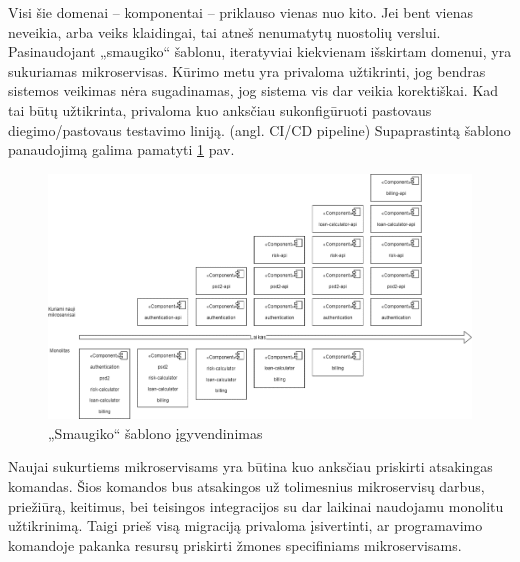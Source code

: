 \documentclass{VUMIFPSbakalaurinis}
\begin{document}
Visi šie domenai – komponentai – priklauso vienas nuo kito. Jei bent vienas neveikia, arba veiks klaidingai, tai atneš nenumatytų nuostolių verslui. Pasinaudojant „smaugiko“ šablonu, iteratyviai kiekvienam išskirtam domenui, yra sukuriamas mikroservisas. Kūrimo metu yra privaloma užtikrinti, jog bendras sistemos veikimas nėra sugadinamas, jog sistema vis dar veikia korektiškai. Kad tai būtų užtikrinta, privaloma kuo anksčiau sukonfigūruoti pastovaus diegimo/pastovaus testavimo liniją. (angl. CI/CD pipeline)  Supaprastintą šablono panaudojimą galima pamatyti \ref{img:smaugiko-sablonas} pav.

\begin{figure}[H]
    \centering
    \includegraphics{img/smaugiko-sablonas.png}
    \caption{„Smaugiko“ šablono įgyvendinimas}
    \label{img:smaugiko-sablonas}
\end{figure}

Naujai sukurtiems mikroservisams yra būtina kuo anksčiau priskirti atsakingas komandas. Šios komandos bus atsakingos už tolimesnius mikroservisų darbus, priežiūrą, keitimus, bei teisingos integracijos su dar laikinai naudojamu monolitu užtikrinimą. Taigi prieš visą migraciją privaloma įsivertinti, ar programavimo komandoje pakanka resursų priskirti žmones specifiniams mikroservisams.
\end{document}
